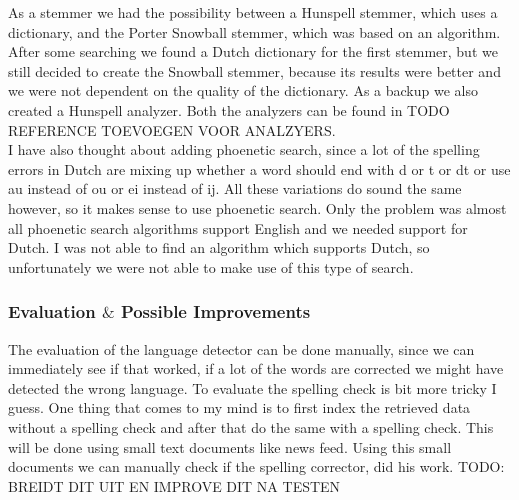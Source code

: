 As a stemmer we had the possibility between a Hunspell stemmer, which uses a dictionary, and the Porter Snowball stemmer, which was based on an algorithm. After some searching we found a Dutch dictionary for the first stemmer, but we still decided to create the Snowball stemmer, because its results were better and we were not dependent on the quality of the dictionary. As a backup we also created a Hunspell analyzer. Both the analyzers can be found in TODO REFERENCE TOEVOEGEN VOOR ANALZYERS.\\
I have also thought about adding phoenetic search, since a lot of the spelling errors in Dutch are mixing up whether a word should end with d or t or dt or use au instead of ou or ei instead of ij. All these variations do sound the same however, so it makes sense to use phoenetic search. Only the problem was almost all phoenetic search algorithms support English and we needed support for Dutch. I was not able to find an algorithm which supports Dutch, so unfortunately we were not able to make use of this type of search.

\subsubsection*{Evaluation $\&$ Possible Improvements }
The evaluation of the language detector can be done manually, since we can immediately see if that worked, if a lot of the words are corrected we might have detected the wrong language. To evaluate the spelling check is bit more tricky I guess. One thing that comes to my mind is to first index the retrieved data without a spelling check and after that do the same with a spelling check. This will be done using small text documents like news feed. Using this small documents we can manually check if the spelling corrector, did his work.
TODO: BREIDT DIT UIT EN IMPROVE DIT NA TESTEN
